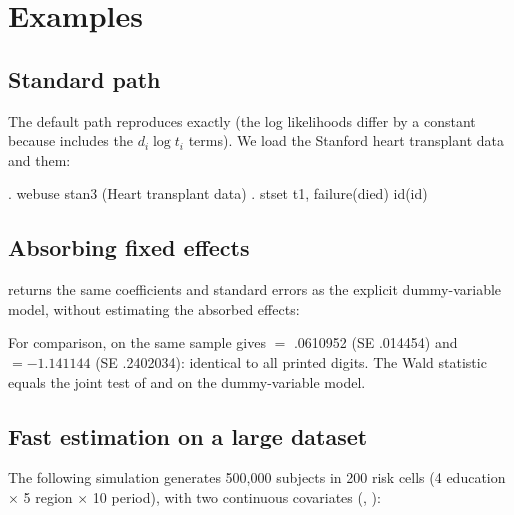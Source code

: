 \documentclass[12pt,a4paper]{article}
\begin{document}
\section{Examples}

\label{sec:examples}

\subsection{Standard path}\label{standard-path}

The default path reproduces 
exactly (the log likelihoods differ by a constant because 
includes the \(d_i \log t_i\) terms). We load the Stanford heart
transplant data and  them:

\begin{stlog}
. webuse stan3
(Heart transplant data)
{\smallskip}
. stset t1, failure(died) id(id)
{\smallskip}
\oom
\end{stlog}

\begin{stlog}
\nullskip
\end{stlog}

\subsection{Absorbing fixed effects}\label{absorbing-fixed-effects}

 returns the same coefficients and standard errors as
the explicit dummy-variable model, without estimating the absorbed
effects:

\begin{stlog}
\nullskip
\end{stlog}

\noindent For comparison,
 on the same
sample gives  \(=\) .0610952 (SE .014454) and
 \(=-1.141144\) (SE .2402034): identical to all printed
digits. The Wald statistic equals the joint test of  and
 on the dummy-variable model.

\subsection{Fast estimation on a large
dataset}\label{fast-estimation-on-a-large-dataset}

The following simulation generates 500,000 subjects in 200 risk cells (4
education \(\times\) 5 region \(\times\) 10 period), with two continuous
covariates (, ):
\end{document}
